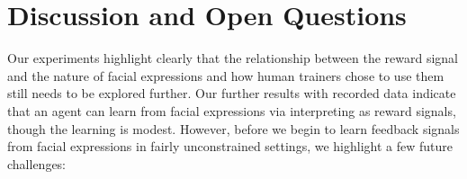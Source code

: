 \documentclass[10pt,journal,compsoc]{IEEEtran}
\begin{document}

\vspace{2mm}

\section{Discussion and Open Questions}
\label{sec:doq}

Our experiments highlight clearly that the relationship between the reward signal and the nature of facial expressions and how human trainers chose to use them still needs to be explored further. Our further results with recorded data indicate that an agent can learn from facial expressions via interpreting as reward signals, though the learning is modest.
However, before we begin to learn feedback signals from facial expressions in fairly unconstrained settings, we highlight a few future challenges:
\end{document}
